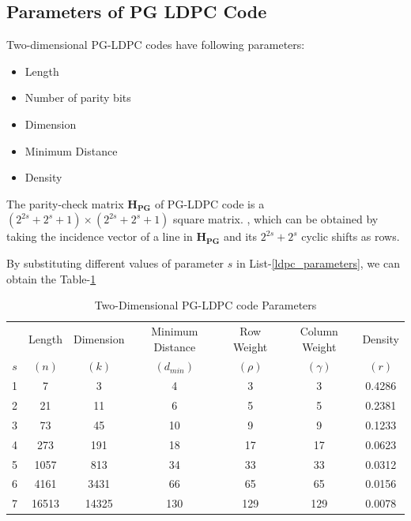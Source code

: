 \subsection{Parameters of PG LDPC Code}
Two-dimensional PG-LDPC codes have following parameters\cite{ecc_shu_lin}:
\begin{itemize} \label {ldpc_parameters}
 \item Length \tab{} 
 \item Number of parity bits 
 \item Dimension \tab{} 
 \item Minimum Distance 
 \item Density \tab{} 
\end{itemize}
The parity-check matrix $\mathbf{H_{PG}}$ of PG-LDPC code is a $(2^{2s}+2^{s}+1)\times (2^{2s}+2^{s}+1)$
square matrix. \cite{ecc_shu_lin}, which can be obtained by taking the incidence vector of a line 
in $\mathbf{H_{PG}}$ and its $2^{2s}+2^{s}$ cyclic shifts as rows.

By substituting different values of parameter $s$ in List-\ref{ldpc_parameters}, we can obtain the 
Table-\ref {ldpc_parameter_table}   
 
 \begin{table} [!h]
 \caption{Two-Dimensional PG-LDPC code Parameters}
  \begin{center}
 \begin{tabular}{||c c c c c c c||} 
 \hline
  &Length &Dimension & Minimum Distance & Row Weight & Column Weight & Density\\ %
 $s$ & $(n)$ & $(k)$& $(d_{min})$ & $(\rho)$ & $(\gamma)$ & $(r)$ \\ %
 \hline
 1 & 7 & 3 & 4 & 3 & 3 & 0.4286\\ 
 2 & 21 & 11 & 6 & 5 & 5 & 0.2381\\ 
 3 & 73 & 45 & 10 & 9 & 9 & 0.1233\\ 
 4 & 273 & 191 & 18 & 17 & 17 & 0.0623\\
 5 & 1057 & 813 & 34 & 33 & 33 & 0.0312\\
 6 & 4161 & 3431 & 66 & 65 & 65 & 0.0156\\
 7 & 16513 & 14325 & 130 & 129 & 129 & 0.0078\\
   \hline
\end{tabular}
\end{center}
\label{ldpc_parameter_table}

\end{table}

